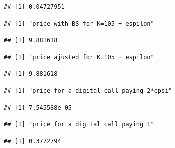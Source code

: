 \documentclass[
]{article}
\begin{document}
\begin{verbatim}
## [1] 0.04727951
\end{verbatim}

\begin{verbatim}
## [1] "price with BS for K=105 + espilon"
\end{verbatim}

\begin{verbatim}
## [1] 9.881618
\end{verbatim}

\begin{verbatim}
## [1] "price ajusted for K=105 + espilon"
\end{verbatim}

\begin{verbatim}
## [1] 9.881618
\end{verbatim}

\begin{verbatim}
## [1] "price for a digital call paying 2*epsi"
\end{verbatim}

\begin{verbatim}
## [1] 7.545588e-05
\end{verbatim}

\begin{verbatim}
## [1] "price for a digital call paying 1"
\end{verbatim}

\begin{verbatim}
## [1] 0.3772794
\end{verbatim}
\end{document}
